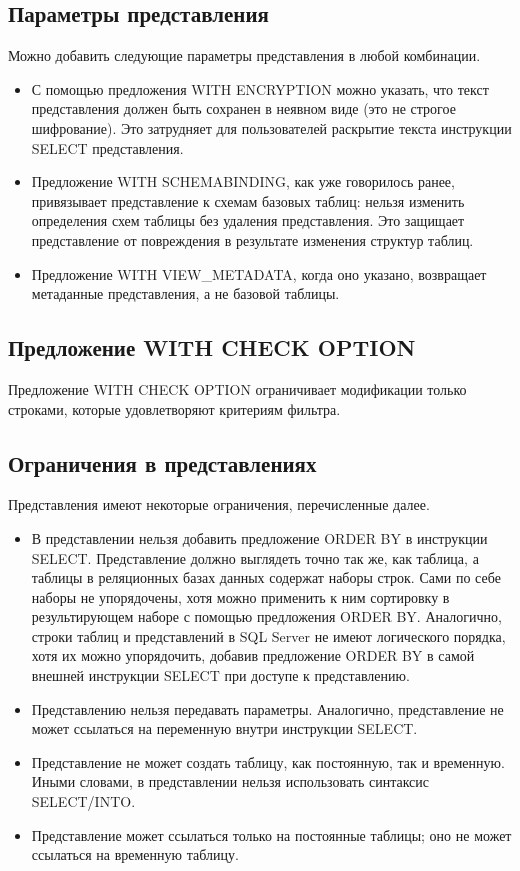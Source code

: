 \subsection{Параметры представления}

Можно добавить следующие параметры представления в любой комбинации. 
\begin{itemize}
	\item  С помощью предложения WITH ENCRYPTION можно указать, что текст представления должен быть сохранен в неявном виде (это не строгое шифрование). Это затрудняет для пользователей раскрытие текста инструкции SELECT представления. 
	\item  Предложение WITH SCHEMABINDING, как уже говорилось ранее, привязывает представление к схемам базовых таблиц: нельзя изменить определения схем таблицы без удаления представления. Это защищает представление от повреждения в результате изменения структур таблиц. 
	\item Предложение WITH VIEW\_METADATA, когда оно указано, возвращает метаданные
	представления, а не базовой таблицы.
\end{itemize}


\subsection{Предложение WITH CHECK OPTION}

Предложение WITH CHECK OPTION ограничивает модификации только строками, которые удовлетворяют критериям фильтра. 

\subsection{Ограничения в представлениях}
Представления имеют некоторые ограничения, перечисленные далее. 

\begin{itemize}
	\item В представлении нельзя добавить предложение ORDER BY в инструкции SELECT.
	Представление должно выглядеть точно так же, как таблица, а таблицы в реляционных базах данных содержат наборы строк. Сами по себе наборы не упорядочены, хотя можно применить к ним сортировку в результирующем наборе
	с помощью предложения ORDER BY. Аналогично, строки таблиц и представлений
	в SQL Server не имеют логического порядка, хотя их можно упорядочить, добавив предложение ORDER BY в самой внешней инструкции SELECT при доступе
	к представлению.
	\item Представлению нельзя передавать параметры. Аналогично, представление не
	может ссылаться на переменную внутри инструкции SELECT. 
	\item Представление не может создать таблицу, как постоянную, так и временную.
	Иными словами, в представлении нельзя использовать синтаксис SELECT/INTO. 
	\item Представление может ссылаться только на постоянные таблицы; оно не может
	ссылаться на временную таблицу. 
\end{itemize}

